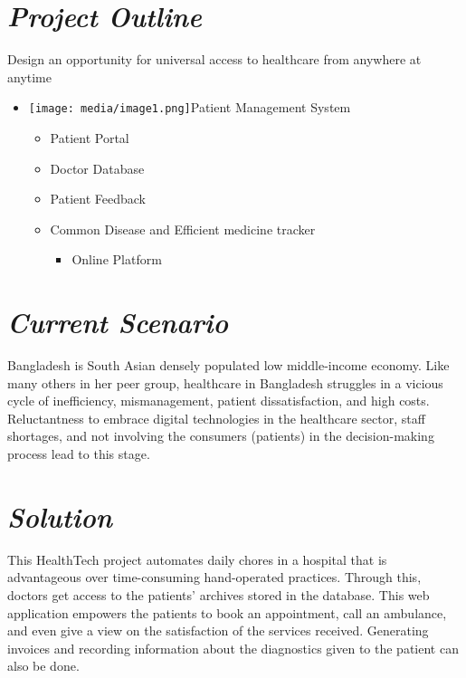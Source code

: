 \documentclass[]{article}
\date{}
\begin{document}
\section{\texorpdfstring{\textbf{\emph{Project
Outline}}}{Project Outline}}\label{project-outline}

Design an opportunity for universal access to healthcare from anywhere
at anytime

\begin{itemize}
\item
  \texttt{[image: media/image1.png]}Patient
  Management System

  \begin{itemize}
  \item
    Patient Portal
  \item
    Doctor Database
  \item
    Patient Feedback
  \item
    Common Disease and Efficient medicine tracker

    \begin{itemize}
    \item
      Online Platform
    \end{itemize}
  \end{itemize}
\end{itemize}

\section{\texorpdfstring{\textbf{\emph{Current
Scenario}}}{Current Scenario}}\label{current-scenario}

Bangladesh is South Asian densely populated low middle-income economy.
Like many others in her peer group, healthcare in Bangladesh struggles
in a vicious cycle of inefficiency, mismanagement, patient
dissatisfaction, and high costs. Reluctantness to embrace digital
technologies in the healthcare sector, staff shortages, and not
involving the consumers (patients) in the decision-making process lead
to this stage.

\section{\texorpdfstring{\textbf{\emph{Solution}}}{Solution}}\label{solution}

This HealthTech project automates daily chores in a hospital that is
advantageous over time-consuming hand-operated practices. Through this,
doctors get access to the patients' archives stored in the database.
This web application empowers the patients to book an appointment, call
an ambulance, and even give a view on the satisfaction of the services
received. Generating invoices and recording information about the
diagnostics given to the patient can also be done.
\end{document}
